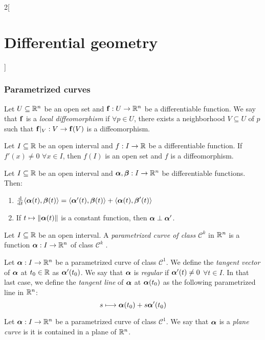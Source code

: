 \documentclass[../../../main.tex]{subfiles}
\begin{document}
\begin{multicols}{2}[\section{Differential geometry}]
  \subsubsection{Parametrized curves}
  \begin{definition}
    Let $U\subseteq\mathbb{R}^n$ be an open set and $\boldsymbol{\mathrm{f}}:U\rightarrow\mathbb{R}^n$ be a differentiable function. We say that $\boldsymbol{\mathrm{f}}$ is a \emph{local diffeomorphism} if $\forall p\in U$, there exists a neighborhood $V\subseteq U$ of $p$ such that $\boldsymbol{\mathrm{f}}|_V:V\rightarrow \boldsymbol{\mathrm{f}}(V)$ is a diffeomorphism.
  \end{definition}
  \begin{proposition}
    Let $I\subseteq\mathbb{R}$ be an open interval and $f:I\rightarrow\mathbb{R}$ be a differentiable function. If $f'(x)\ne 0$ $\forall x\in I$, then $f(I)$ is an open set and $f$ is a diffeomorphism.
  \end{proposition}
  \begin{proposition}
    Let $I\subseteq\mathbb{R}$ be an open interval and $\boldsymbol{\mathrm{\alpha}},\boldsymbol{\mathrm{\beta}}:I\rightarrow\mathbb{R}^n$ be differentiable functions. Then:
    \begin{enumerate}
      \item $\dv{}{t}\langle\boldsymbol{\mathrm{\alpha}}(t),\boldsymbol{\mathrm{\beta}}(t)\rangle=\langle\boldsymbol{\mathrm{\alpha}}'(t),\boldsymbol{\mathrm{\beta}}(t)\rangle+\langle\boldsymbol{\mathrm{\alpha}}(t),\boldsymbol{\mathrm{\beta}}'(t)\rangle$
      \item If $t\mapsto\|\boldsymbol{\mathrm{\alpha}}(t)\|$ is a constant function, then $\boldsymbol{\mathrm{\alpha}}\perp\boldsymbol{\mathrm{\alpha}}'$.
    \end{enumerate}
  \end{proposition}
  \begin{definition}
    Let $I\subseteq\mathbb{R}$ be an open interval. A \emph{parametrized curve of class $\mathcal{C}^k$} in $\mathbb{R}^n$ is a function $\boldsymbol{\mathrm{\alpha}}:I\rightarrow\mathbb{R}^n$ of class $\mathcal{C}^k$ .
  \end{definition}
  \begin{definition}
    Let $\boldsymbol{\mathrm{\alpha}}:I\rightarrow\mathbb{R}^n$ be a parametrized curve of class $\mathcal{C}^1$. We define the \emph{tangent vector} of $\boldsymbol{\mathrm{\alpha}}$ at $t_0\in\mathbb{R}$ as $\boldsymbol{\mathrm{\alpha}}'(t_0)$. We say that $\boldsymbol{\mathrm{\alpha}}$ is \emph{regular} if $\boldsymbol{\mathrm{\alpha}}'(t)\ne 0$ $\forall t\in I$. In that last case, we define the \emph{tangent line} of $\boldsymbol{\mathrm{\alpha}}$ at $\boldsymbol{\mathrm{\alpha}}(t_0)$ as the following parametrized line in $\mathbb{R}^n$: $$s\longmapsto \boldsymbol{\mathrm{\alpha}}(t_0)+s\boldsymbol{\mathrm{\alpha}}'(t_0)$$
  \end{definition}
  \begin{definition}
    Let $\boldsymbol{\mathrm{\alpha}}:I\rightarrow\mathbb{R}^n$ be a parametrized curve of class $\mathcal{C}^1$. We say that $\boldsymbol{\mathrm{\alpha}}$ is a \emph{plane curve} is it is contained in a plane of $\mathbb{R}^n$.

\end{definition}
\end{multicols}
\end{document}
